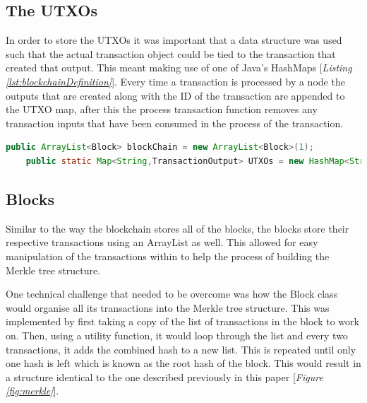 \documentclass{l4proj}
\begin{document}
\subsection{The UTXOs}
In order to store the UTXOs it was important that a data structure was used such that the actual transaction
object could be tied to the transaction that created that output. This meant making use of one of Java's HashMaps
[\textit{Listing \ref{lst:blockchainDefinition}}]. Every time a transaction is processed by a node the outputs that are created 
along with the ID of the transaction are appended to the UTXO map, after this the process transaction function 
removes any transaction inputs that have been consumed in the process of the transaction.

\begin{lstlisting}[language=java, float, caption={This figure shows the definitions for the blockchain and also 
    the UTXO maps. The blockchain is an ArrayList created with one starting block acting as a genesis block. The 
    UTXO map is a HashMap mapping the transaction id to the transaction output created from each transaction.},
    label=lst:blockchainDefinition]
    public ArrayList<Block> blockChain = new ArrayList<Block>(1);
    public static Map<String,TransactionOutput> UTXOs = new HashMap<String,TransactionOutput>();
\end{lstlisting}

\subsection{Blocks}
Similar to the way the blockchain stores all of the blocks, the blocks store their respective transactions 
using an ArrayList as well. This allowed for easy manipulation of the transactions within to help the process of
building the Merkle tree structure.

One technical challenge that needed to be overcome was how the Block class would organise all its transactions
into the Merkle tree structure. This was implemented by first taking a copy of the list of transactions in the
block to work on. Then, using a utility function, it would loop through the list and every two transactions, it 
adds the combined hash to a new list. This is repeated until only one hash is left which is known as the root 
hash of the block. This would result in a structure identical to the one described previously in this paper
[\textit{Figure \ref{fig:merkle}}].

\end{document}
